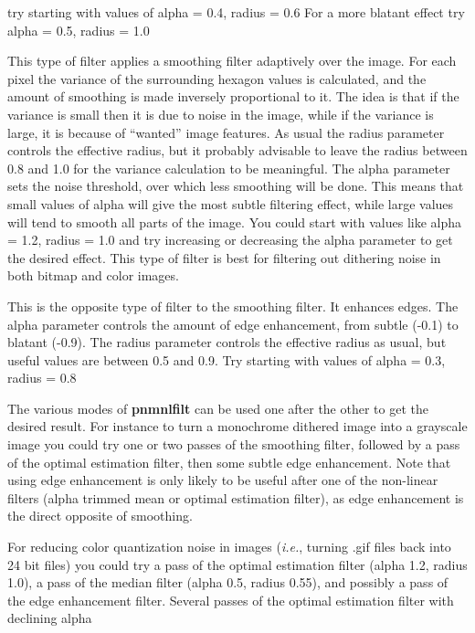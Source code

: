 try starting with values of alpha = 0.4, radius = 0.6  For a more blatant
effect try alpha = 0.5, radius = 1.0
\par
This type of filter applies a smoothing filter adaptively over the image.
For each pixel the variance of the surrounding hexagon values is calculated,
and the amount of smoothing is made inversely proportional to it. The idea
is that if the variance is small then it is due to noise in the image, while
if the variance is large, it is because of ``wanted'' image features. As usual
the radius parameter controls the effective radius, but it probably advisable to
leave the radius between 0.8 and 1.0 for the variance calculation to be meaningful.
The alpha parameter sets the noise threshold, over which less smoothing will be done.
This means that small values of alpha will give the most subtle filtering effect,
while large values will tend to smooth all parts of the image. You could start
with values like alpha = 1.2, radius = 1.0 and try increasing or decreasing the
alpha parameter to get the desired effect. This type of filter is best for
filtering out dithering noise in both bitmap and color images.
\par
This is the opposite type of filter to the smoothing filter. It enhances
edges. The alpha parameter controls the amount of edge enhancement, from
subtle (-0.1) to blatant (-0.9). The radius parameter controls the effective
radius as usual, but useful values are between 0.5 and 0.9. Try starting
with values of alpha = 0.3, radius = 0.8
\par
The various modes of 
{\bf pnmnlfilt}
can be used one after the other to get the desired result. For instance to
turn a monochrome dithered image into a grayscale image you could try
one or two passes of the smoothing filter, followed by a pass of the optimal estimation
filter, then some subtle edge enhancement. Note that using edge enhancement is
only likely to be useful after one of the non-linear filters (alpha trimmed mean
or optimal estimation filter), as edge enhancement is the direct opposite of
smoothing.
\par
For reducing color quantization noise in images ({\it i.e.}, turning .gif files back into
24 bit files) you could try a pass of the optimal estimation filter
(alpha 1.2, radius 1.0), a pass of the median filter (alpha 0.5, radius 0.55),
and possibly a pass of the edge enhancement filter.
Several passes of the optimal estimation filter with declining alpha
